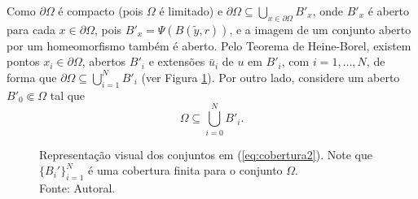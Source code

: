 \documentclass[a4paper, 11pt]{book}
\theoremstyle{definition}
\begin{document}
\begin{prf}
    Como $\partial\Omega$ é compacto (pois $\Omega$ é limitado) e $\partial \Omega \subseteq \bigcup_{x \in \partial\Omega} B'_x$,
    onde $B'_x$ é aberto para cada $x \in \partial\Omega$, pois $B'_x = \Psi(B(\tilde y, r))$, e a imagem de um conjunto aberto por um homeomorfismo também é aberto. Pelo Teorema de Heine-Borel, existem pontos $x_i \in \partial\Omega$, abertos $B'_i$ e extensões $\bar u_i$ de $u$ em $B'_i$, com $i = 1,\dots,N$, de forma que $\partial\Omega \subseteq \bigcup_{i=1}^N B'_i$ (ver Figura \ref{fig:coberturafronteirab0}).
    Por outro lado, considere um aberto $B'_0 \Subset \Omega$ tal que
    \begin{equation} \label{eq:cobertura2}
        \Omega \subseteq \bigcup_{i=0}^N B'_i.
    \end{equation}
    \begin{figure}
        \centering
        
        \caption{Representação visual dos conjuntos em (\ref{eq:cobertura2}). Note que $\{B_i'\}_{i=1}^N$ é uma cobertura finita para o conjunto $\Omega$.\\Fonte: Autoral.}
        \label{fig:coberturafronteirab0}
    \end{figure}



\end{prf}
\end{document}
